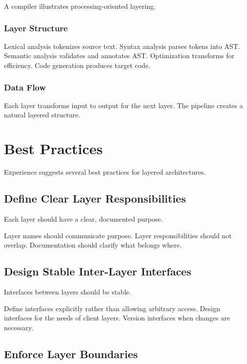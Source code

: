 \documentclass[11pt]{article}
\begin{document}
A compiler illustrates processing-oriented layering.

\subsubsection{Layer Structure}

Lexical analysis tokenizes source text. Syntax analysis parses tokens into AST. Semantic analysis validates and annotates AST. Optimization transforms for efficiency. Code generation produces target code.

\subsubsection{Data Flow}

Each layer transforms input to output for the next layer. The pipeline creates a natural layered structure.

\section{Best Practices}

Experience suggests several best practices for layered architectures.

\subsection{Define Clear Layer Responsibilities}

Each layer should have a clear, documented purpose.

Layer names should communicate purpose. Layer responsibilities should not overlap. Documentation should clarify what belongs where.

\subsection{Design Stable Inter-Layer Interfaces}

Interfaces between layers should be stable.

Define interfaces explicitly rather than allowing arbitrary access. Design interfaces for the needs of client layers. Version interfaces when changes are necessary.

\subsection{Enforce Layer Boundaries}
\end{document}
